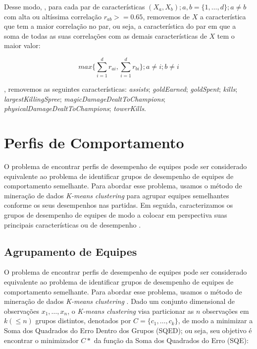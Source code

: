 Desse modo, , para cada par de características $(X_a, X_b); a, b=\{1, \ldots, d\};a \neq b$ com alta ou altíssima correlação $r_{ab} >= 0.65$, removemos de $X$ a característica que tem a maior correlação no par, ou seja, a característica do par em que a soma de todas as suas correlações com as demais características de $X$ tem o maior valor:

\begin{displaymath}
  max \big\{ \sum_{i=1}^{d} r_{ai} ,  \sum_{i=1}^{d} r_{bi} \big\}; a \neq i; b \neq i
\end{displaymath}

, removemos as seguintes características: \textit{assists}; \textit{goldEarned}; \textit{goldSpent}; \textit{kills}; \textit{largestKillingSpree}; \textit{magicDamageDealtToChampions}; \textit{physicalDamageDealtToChampions}; \textit{towerKills}.

\chapter{Perfis de Comportamento}

O problema de encontrar perfis de desempenho de equipes pode ser considerado equivalente ao problema de identificar grupos de desempenho de equipes de comportamento semelhante. Para abordar esse problema, usamos o método de mineração de dados \textit{K-means clustering} \cite{zaki2014data} para agrupar equipes semelhantes conforme os seus desempenhos nas partidas. Em seguida, caracterizamos  os grupos de desempenho de equipes de modo a colocar em perspectiva suas principais características ou  de desempenho .

\section{Agrupamento de Equipes}
O problema de encontrar perfis de desempenho de equipes pode ser considerado equivalente ao problema de identificar grupos de desempenho de equipes de comportamento semelhante. Para abordar esse problema, usamos o método de mineração de dados \textit{K-means clustering} \cite{zaki2014data}. Dado um conjunto dimensional de observações \(x_1, \ldots, x_n \), o \textit{K-means clustering} visa particionar as $n$ observações em $k (\leq n)$ grupos distintos, denotados por $ C = \{c_1, \ldots , c_k \} $, de modo a minimizar a Soma dos Quadrados do Erro Dentro dos Grupos (SQED); ou seja, seu objetivo é encontrar o minimizador $C*$ da função da Soma dos Quadrados do Erro (SQE):

